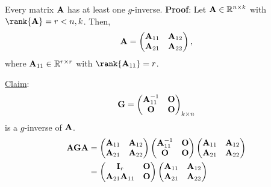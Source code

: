 \begin{Lemma}{}{}
    Every matrix $ \mathbf{A} $ has at least one $ g $-inverse.
    \tcblower{}
    \textbf{Proof}: Let $ \mathbf{A}\in\mathbb{R}^{n\times k} $ with $ \rank{\Matrix{A}}=r<\min{n,k} $. Then,
    \[ \mathbf{A}=\begin{pmatrix}
            \mathbf{A}_{11} & \mathbf{A}_{12} \\
            \mathbf{A}_{21} & \mathbf{A}_{22}
        \end{pmatrix}, \]
    where $ \mathbf{A}_{11}\in\mathbb{R}^{r\times r} $ with $ \rank{\Matrix{A}_{11}}=r $.

    \underline{Claim}:
    \[ \mathbf{G}=\begin{pmatrix}
            \mathbf{A}_{11}^{-1} & \mathbf{O} \\
            \mathbf{O}           & \mathbf{O}
        \end{pmatrix}_{k\times n} \]
    is a $ g $-inverse of $ \mathbf{A} $.
    \begin{align*}
        \Matrix{AGA}
         & =
        \begin{pmatrix}
            \Matrix{A}_{11} & \Matrix{A}_{12} \\
            \Matrix{A}_{21} & \Matrix{A}_{22}
        \end{pmatrix}\begin{pmatrix}
                         \Matrix{A}_{11}^{-1} & \Matrix{O} \\
                         \Matrix{O}           & \Matrix{O}
                     \end{pmatrix}\begin{pmatrix}
                                      \Matrix{A}_{11} & \Matrix{A}_{12} \\
                                      \Matrix{A}_{21} & \Matrix{A}_{22}
                                  \end{pmatrix}              \\
         & =\begin{pmatrix}
                \Matrix{I}_r                   & \Matrix{O} \\
                \Matrix{A}_{21}\Matrix{A}_{11} & \Matrix{O}
            \end{pmatrix}\begin{pmatrix}
                             \Matrix{A}_{11} & \Matrix{A}_{12} \\
                             \Matrix{A}_{21} & \Matrix{A}_{22}
                         \end{pmatrix}                       \\

\end{align*}
\end{Lemma}
